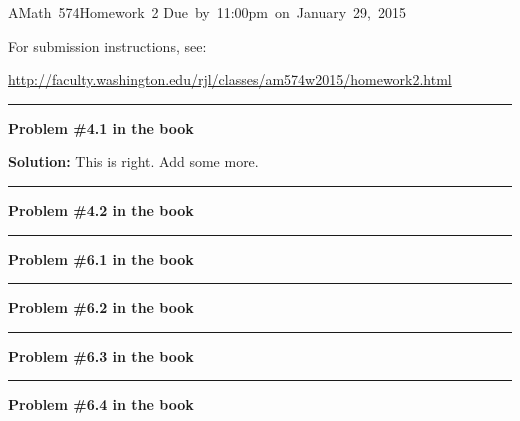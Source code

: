 \documentclass[11pt]{article}
\begin{document}
\hfill\vbox{\hbox{AMath 574}\hbox{Homework 2}
\hbox{Due by 11:00pm on January 29, 2015}}

For submission instructions, see:

\url{http://faculty.washington.edu/rjl/classes/am574w2015/homework2.html}

\vskip 1cm
\hrule
{\bf Problem \#4.1 in the book}


\vskip 1cm
{\bf Solution:}
This is right.
Add some more.



\vskip 1cm
\hrule
{\bf Problem \#4.2 in the book}




\vskip 1cm
\hrule
{\bf Problem \#6.1 in the book}




\vskip 1cm
\hrule
{\bf Problem \#6.2 in the book}




\vskip 1cm
\hrule
{\bf Problem \#6.3 in the book}





\vskip 1cm
\hrule
{\bf Problem \#6.4 in the book}


\end{document}
